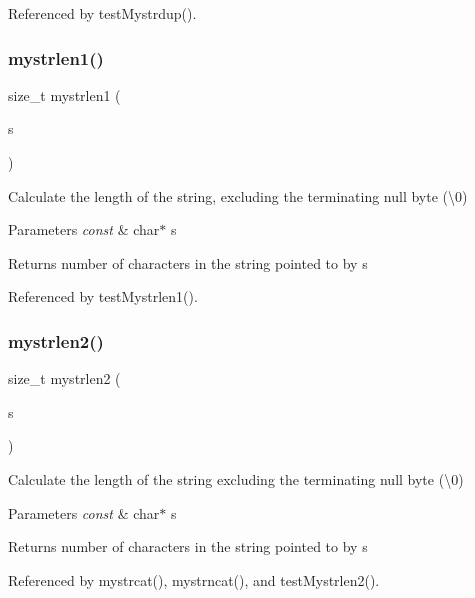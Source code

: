 Referenced by test\+Mystrdup().

\mbox{\label{mystring_8h_a71f9f1095f41990d202157923cfe578a}} 
\subsubsection{mystrlen1()}
{\footnotesize\ttfamily size\+\_\+t mystrlen1 (\begin{DoxyParamCaption}\item[{const char $\ast$}]{s }\end{DoxyParamCaption})}

Calculate the length of the string, excluding the terminating null byte (\textquotesingle{}\textbackslash{}0\textquotesingle{}) 
\begin{DoxyParams}{Parameters}
{\em const} & char$\ast$ s \\
\hline
\end{DoxyParams}
\begin{DoxyReturn}{Returns}
number of characters in the string pointed to by s 
\end{DoxyReturn}


Referenced by test\+Mystrlen1().

\mbox{\label{mystring_8h_a0553e98c4213b02262ce36a73cc9b088}} 
\subsubsection{mystrlen2()}
{\footnotesize\ttfamily size\+\_\+t mystrlen2 (\begin{DoxyParamCaption}\item[{const char $\ast$}]{s }\end{DoxyParamCaption})}

Calculate the length of the string excluding the terminating null byte (\textquotesingle{}\textbackslash{}0\textquotesingle{}) 
\begin{DoxyParams}{Parameters}
{\em const} & char$\ast$ s \\
\hline
\end{DoxyParams}
\begin{DoxyReturn}{Returns}
number of characters in the string pointed to by s 
\end{DoxyReturn}


Referenced by mystrcat(), mystrncat(), and test\+Mystrlen2().

